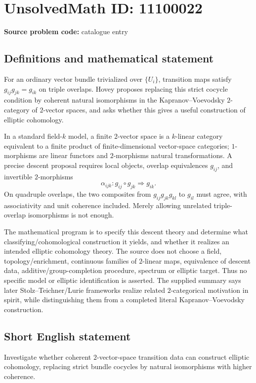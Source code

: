 \documentclass[11pt]{article}
\begin{document}
\section*{UnsolvedMath ID: 11100022}
\textbf{Source problem code:} catalogue entry
\subsection{Definitions and mathematical statement}
For an ordinary vector bundle trivialized over \(\{U_i\}\), transition maps satisfy \(g_{ij}g_{jk}=g_{ik}\) on triple overlaps. Hovey proposes replacing this strict cocycle condition by coherent natural isomorphisms in the Kapranov--Voevodsky \(2\)-category of \(2\)-vector spaces, and asks whether this gives a useful construction of elliptic cohomology.

In a standard field-\(k\) model, a finite \(2\)-vector space is a \(k\)-linear category equivalent to a finite product of finite-dimensional vector-space categories; \(1\)-morphisms are linear functors and \(2\)-morphisms natural transformations. A precise descent proposal requires local objects, overlap equivalences \(g_{ij}\), and invertible \(2\)-morphisms
\[
 \alpha_{ijk}:g_{ij}\circ g_{jk}\Longrightarrow g_{ik}.
\]
On quadruple overlaps, the two composites from \(g_{ij}g_{jk}g_{kl}\) to \(g_{il}\) must agree, with associativity and unit coherence included. Merely allowing unrelated triple-overlap isomorphisms is not enough.

The mathematical program is to specify this descent theory and determine what classifying/cohomological construction it yields, and whether it realizes an intended elliptic cohomology theory. The source does not choose a field, topology/enrichment, continuous families of \(2\)-linear maps, equivalence of descent data, additive/group-completion procedure, spectrum or elliptic target. Thus no specific model or elliptic identification is asserted. The supplied summary says later Stolz--Teichner/Lurie frameworks realize related \(2\)-categorical motivation in spirit, while distinguishing them from a completed literal Kapranov--Voevodsky construction.
\subsection{Short English statement}
Investigate whether coherent \(2\)-vector-space transition data can construct elliptic cohomology, replacing strict bundle cocycles by natural isomorphisms with higher coherence.
\end{document}
